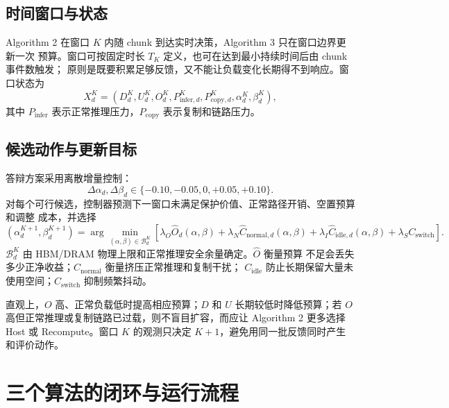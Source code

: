 \documentclass[UTF8,11pt,a4paper]{ctexart}
\begin{document}
\subsection{时间窗口与状态}

Algorithm 2 在窗口 $K$ 内随 chunk 到达实时决策，Algorithm 3 只在窗口边界更新一次
预算。窗口可按固定时长 $T_K$ 定义，也可在达到最小持续时间后由 chunk 事件数触发；
原则是既要积累足够反馈，又不能让负载变化长期得不到响应。窗口状态为
\begin{equation}
  X_d^K=(D_d^K,U_d^K,O_d^K,
  P_{\mathrm{infer},d}^K,P_{\mathrm{copy},d}^K,
  \alpha_d^K,\beta_d^K),
  \label{eq:window-state}
\end{equation}
其中 $P_{\mathrm{infer}}$ 表示正常推理压力，$P_{\mathrm{copy}}$ 表示复制和链路压力。

\subsection{候选动作与更新目标}

答辩方案采用离散增量控制：
\begin{equation}
  \Delta\alpha_d,\Delta\beta_d
  \in\{-0.10,-0.05,0,+0.05,+0.10\}.
  \label{eq:budget-actions}
\end{equation}
对每个可行候选，控制器预测下一窗口未满足保护价值、正常路径开销、空置预算和调整
成本，并选择
\begin{equation}
  (\alpha_d^{K+1},\beta_d^{K+1})
  =\arg\min_{(\alpha,\beta)\in\mathcal B_d^K}
  \left[
    \lambda_O\widehat O_d(\alpha,\beta)
    +\lambda_N\widehat C_{\mathrm{normal},d}(\alpha,\beta)
    +\lambda_I\widehat C_{\mathrm{idle},d}(\alpha,\beta)
    +\lambda_S C_{\mathrm{switch}}
  \right].
  \label{eq:alg3-objective}
\end{equation}
$\mathcal B_d^K$ 由 HBM/DRAM 物理上限和正常推理安全余量确定。$\widehat O$ 衡量预算
不足会丢失多少正净收益；$C_{\mathrm{normal}}$ 衡量挤压正常推理和复制干扰；
$C_{\mathrm{idle}}$ 防止长期保留大量未使用空间；$C_{\mathrm{switch}}$ 抑制频繁抖动。

直观上，$O$ 高、正常负载低时提高相应预算；$D$ 和 $U$ 长期较低时降低预算；若
$O$ 高但正常推理或复制链路已过载，则不盲目扩容，而应让 Algorithm 2 更多选择 Host
或 Recompute。窗口 $K$ 的观测只决定 $K+1$，避免用同一批反馈同时产生和评价动作。

\section{三个算法的闭环与运行流程}
\end{document}
